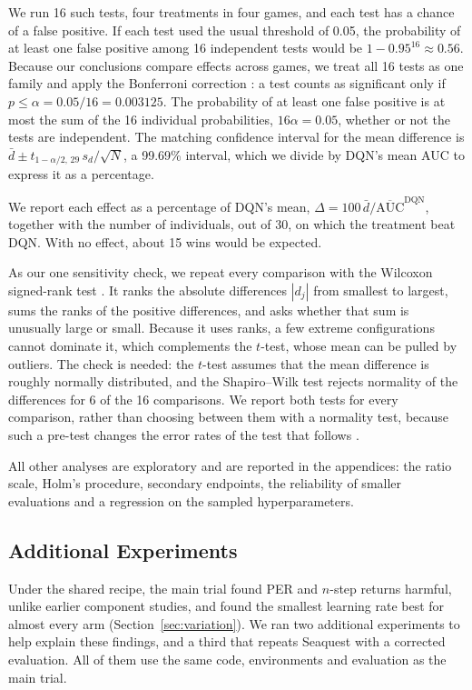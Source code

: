 \documentclass[conference,a4paper]{IEEEtran}
\begin{document}
We run 16 such tests, four treatments in four games, and each test has a chance of a false positive. If each test used
the usual threshold of 0.05, the probability of at least one false positive among 16 independent tests would be
$1-0.95^{16}\approx0.56$. Because our conclusions compare effects across games, we treat all 16 tests as one family and
apply the Bonferroni correction \citep{dunn1961multiple}: a test counts as significant only if
$p\le\alpha=0.05/16=0.003125$. The probability of at least one false positive is at most the sum of the 16 individual
probabilities, $16\alpha=0.05$, whether or not the tests are independent. The matching confidence interval for the mean
difference is $\bar d\pm t_{1-\alpha/2,\,29}\,s_d/\sqrt{N}$, a 99.69\% interval, which we divide by DQN's mean AUC to
express it as a percentage.

We report each effect as a percentage of DQN's mean, $\Delta=100\,\bar d/\overline{\mathrm{AUC}}^{\mathrm{DQN}}$, together
with the number of individuals, out of 30, on which the treatment beat DQN. With no effect, about 15 wins would be
expected.

As our one sensitivity check, we repeat every comparison with the Wilcoxon signed-rank test
\citep{wilcoxon1945individual}. It ranks the absolute differences $|d_j|$ from smallest to largest, sums the ranks of
the positive differences, and asks whether that sum is unusually large or small. Because it uses ranks, a few extreme
configurations cannot dominate it, which complements the $t$-test, whose mean can be pulled by outliers. The check is
needed: the $t$-test assumes that the mean difference is roughly normally distributed, and the Shapiro--Wilk
test \citep{shapiro1965analysis} rejects normality of the differences for 6 of the 16 comparisons. We report both
tests for every comparison, rather than choosing between them with a normality test, because such a pre-test changes
the error rates of the test that follows \citep{rochon2012test}.

All other analyses are exploratory and are reported in the appendices: the ratio scale, Holm's procedure, secondary
endpoints, the reliability of smaller evaluations and a regression on the sampled hyperparameters.

\subsection{Additional Experiments}\label{sec:additional}
Under the shared recipe, the main trial found PER and $n$-step returns harmful, unlike earlier component studies,
and found the smallest
learning rate best for almost every arm (Section~\ref{sec:variation}). We ran two additional experiments to help explain
these findings, and a third that repeats Seaquest with a corrected evaluation. All of them use the same code, environments and evaluation as the main trial.
\end{document}
